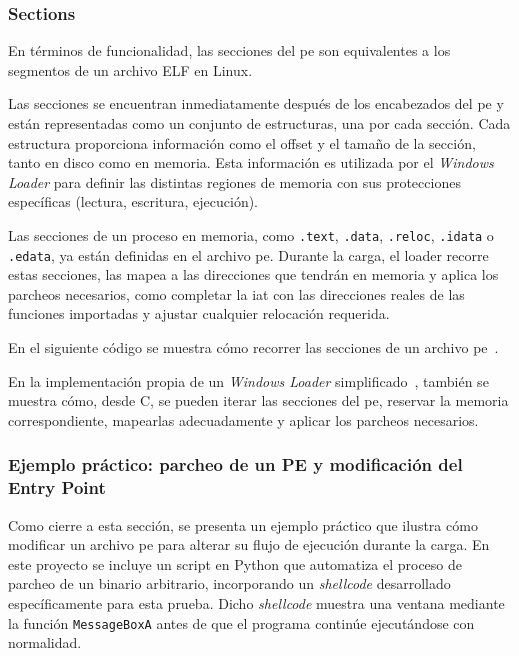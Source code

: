 \subsubsection{Sections}

En términos de funcionalidad, las secciones del \acrshort{pe} son equivalentes a los segmentos de un archivo ELF en Linux.

Las secciones se encuentran inmediatamente después de los encabezados del \acrshort{pe} y están representadas como un conjunto de estructuras, una por cada sección.  
Cada estructura proporciona información como el offset y el tamaño de la sección, tanto en disco como en memoria. Esta información es utilizada por el \textit{Windows Loader} para definir las distintas regiones de memoria con sus protecciones específicas (lectura, escritura, ejecución).

Las secciones de un proceso en memoria, como \texttt{.text}, \texttt{.data}, \texttt{.reloc}, \texttt{.idata} o \texttt{.edata}, ya están definidas en el archivo \acrshort{pe}.  
Durante la carga, el loader recorre estas secciones, las mapea a las direcciones que tendrán en memoria y aplica los parcheos necesarios, como completar la \acrshort{iat} con las direcciones reales de las funciones importadas y ajustar cualquier relocación requerida.

En el siguiente código se muestra cómo recorrer las secciones de un archivo \acrshort{pe}~\cite{walking_PE_headers}.

En la implementación propia de un \textit{Windows Loader} simplificado~\cite{walkingloader}, también se muestra cómo, desde C, se pueden iterar las secciones del \acrshort{pe}, reservar la memoria correspondiente, mapearlas adecuadamente y aplicar los parcheos necesarios.


\subsubsection{Ejemplo práctico: parcheo de un PE y modificación del Entry Point}

Como cierre a esta sección, se presenta un ejemplo práctico que ilustra cómo modificar un archivo \acrshort{pe} para alterar su flujo de ejecución durante la carga. En este proyecto se incluye un script en Python que automatiza el proceso de parcheo de un binario arbitrario, incorporando un \textit{shellcode} desarrollado específicamente para esta prueba. Dicho \textit{shellcode} muestra una ventana mediante la función \texttt{MessageBoxA} antes de que el programa continúe ejecutándose con normalidad.

